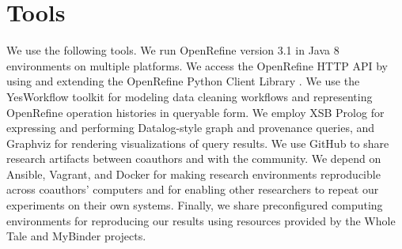 \section{Tools}

We use the following tools. We run OpenRefine version 3.1 \cite{OpenRefine} in Java 8 environments on multiple platforms. We access the OpenRefine HTTP API by using and extending the OpenRefine Python Client Library \cite{makepeace18ORclient}. We use the YesWorkflow toolkit \cite{yw-website} for modeling data cleaning workflows and representing OpenRefine operation histories in queryable form. We employ XSB Prolog \cite{xsb_software} for expressing and performing Datalog-style graph and provenance queries, and Graphviz for rendering visualizations of query results. We use GitHub to share research artifacts between coauthors and with the community. We depend on Ansible, Vagrant, and Docker for making research environments reproducible across coauthors' computers and for enabling other researchers to repeat our experiments on their own systems. Finally, we share preconfigured computing environments for reproducing our results using resources provided by the Whole Tale \cite{brinckman2019computing} and MyBinder projects.

